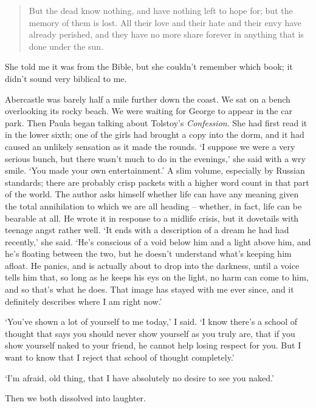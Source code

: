 \begin{quote}
    But the dead know nothing, and have nothing left to hope for; but the memory of them is lost. All their love and their hate and their envy have already perished, and they have no more share forever in anything that is done under the sun.
\end{quote}

She told me it was from the Bible, but she couldn't remember which book; it didn't sound very biblical to me.

Abercastle was barely half a mile further down the coast. We sat on a bench overlooking its rocky beach. We were waiting for George to appear in the car park. Then Paula began talking about Tolstoy's \textit{Confession}. She had first read it in the lower sixth; one of the girls had brought a copy into the dorm, and it had caused an unlikely sensation as it made the rounds. `I suppose we were a very serious bunch, but there wasn't much to do in the evenings,' she said with a wry smile. `You made your own entertainment.' A slim volume, especially by Russian standards; there are probably crisp packets with a higher word count in that part of the world. The author asks himself whether life can have any meaning given the total annihilation to which we are all heading -- whether, in fact, life can be bearable at all. He wrote it in response to a midlife crisis, but it dovetails with teenage angst rather well. `It ends with a description of a dream he had had recently,' she said. `He's conscious of a void below him and a light above him, and he's floating between the two, but he doesn't understand what's keeping him afloat. He panics, and is actually about to drop into the darkness, until a voice tells him that, so long as he keeps his eys on the light, no harm can come to him, and so that's what he does. That image has stayed with me ever since, and it definitely describes where I am right now.'

`You've shown a lot of yourself to me today,' I said. `I know there's a school of thought that says you should never show yourself as you truly are, that if you show yourself naked to your friend, he cannot help losing respect for you. But I want to know that I reject that school of thought completely.'

`I'm afraid, old thing, that I have absolutely no desire to see you naked.'

Then we both dissolved into laughter.

\section{}

